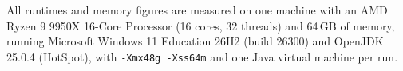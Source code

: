 All runtimes and memory figures are measured on one machine with an AMD Ryzen 9 9950X 16-Core Processor (16 cores, 32 threads) and 64\,GB of memory, running Microsoft Windows 11 Education 26H2 (build 26300) and OpenJDK 25.0.4 (HotSpot), with \texttt{-Xmx48g -Xss64m} and one Java virtual machine per run.
